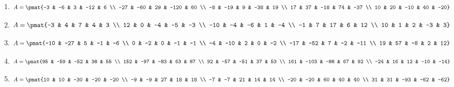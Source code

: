 \begin{enumerate}
\item

\begin{align*}
A = \pmat{-3 & -6 & 3 & -12 & 6 \\ -27 & -60 & 29 & -120 & 60 \\ -8 & -19 & 9 & -38 & 19 \\ 17 & 37 & -18 & 74 & -37 \\ 10 & 20 & -10 & 40 & -20}
\end{align*}

\item

\begin{align*}
A = \pmat{-3 & 4 & 7 & 4 & 3 \\ 12 & 0 & -4 & -5 & -3 \\ -10 & -4 & -6 & 1 & -4 \\ -1 & 7 & 17 & 6 & 12 \\ 10 & 1 & 2 & -3 & 3}
\end{align*}

\item

\begin{align*}
A = \pmat{-10 & -27 & 5 & -1 & -6 \\ 0 & -2 & 0 & -1 & -1 \\ -4 & -10 & 2 & 0 & -2 \\ -17 & -52 & 7 & -2 & -11 \\ 19 & 57 & -8 & 2 & 12}
\end{align*}

\item

\begin{align*}
A = \pmat{95 & -59 & -52 & 38 & 55 \\ 152 & -97 & -83 & 63 & 87 \\ 92 & -57 & -51 & 37 & 53 \\ 161 & -103 & -88 & 67 & 92 \\ -24 & 16 & 12 & -10 & -14}
\end{align*}

\item

\begin{align*}
A = \pmat{10 & 10 & -30 & -20 & -20 \\ -9 & -9 & 27 & 18 & 18 \\ -7 & -7 & 21 & 14 & 14 \\ -20 & -20 & 60 & 40 & 40 \\ 31 & 31 & -93 & -62 & -62}
\end{align*}


\end{enumerate}

